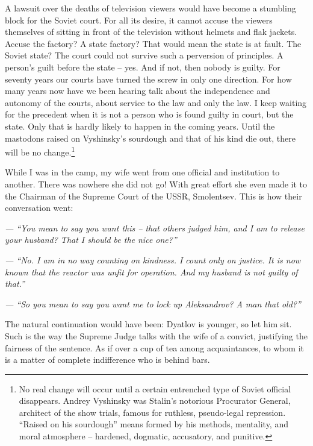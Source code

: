 \documentclass[openright]{bookest}
\begin{document}
A lawsuit over the deaths of television viewers would have become a stumbling block for the Soviet court. For all its desire, it cannot accuse the viewers themselves of sitting in front of the television without helmets and flak jackets. Accuse the factory? A state factory? That would mean the state is at fault. The Soviet state? The court could not survive such a perversion of principles. A person's guilt before the state -- yes. And if not, then nobody is guilty. For seventy years our courts have turned the screw in only one direction. For how many years now have we been hearing talk about the independence and autonomy of the courts, about service to the law and only the law. I keep waiting for the precedent when it is not a person who is found guilty in court, but the state. Only that is hardly likely to happen in the coming years. Until the mastodons raised on Vyshinsky's sourdough and that of his kind die out, there will be no change.\footnote{No real change will occur until a certain entrenched type of Soviet official disappears. Andrey Vyshinsky was Stalin's notorious Procurator General, architect of the show trials, famous for ruthless, pseudo-legal repression. ``Raised on his sourdough'' means formed by his methods, mentality, and moral atmosphere -- hardened, dogmatic, accusatory, and punitive.}

While I was in the camp, my wife went from one official and institution to another. There was nowhere she did not go! With great effort she even made it to the Chairman of the Supreme Court of the USSR, Smolentsev. This is how their conversation went:

\begin{personal}
\textit{--- ``You mean to say you want this -- that others judged him, and I am to release your husband? That I should be the nice one?''}

\textit{--- ``No. I am in no way counting on kindness. I count only on justice. It is now known that the reactor was unfit for operation. And my husband is not guilty of that.''}

\textit{--- ``So you mean to say you want me to lock up Aleksandrov? A man that old?''}
\end{personal}

The natural continuation would have been: Dyatlov is younger, so let him sit. Such is the way the Supreme Judge talks with the wife of a convict, justifying the fairness of the sentence. As if over a cup of tea among acquaintances, to whom it is a matter of complete indifference who is behind bars.
\end{document}
